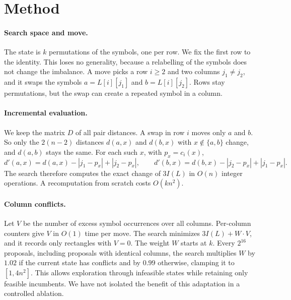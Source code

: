 \documentclass[11pt]{article}
\begin{document}
\section{Method}

\paragraph{Search space and move.} The state is $k$ permutations of the symbols, one per row. We
fix the first row to the identity. This loses no generality, because a relabelling of the
symbols does not change the imbalance. A move picks a row $i\ge 2$ and two columns
$j_1\ne j_2$, and it swaps the symbols $a=L[i][j_1]$ and $b=L[i][j_2]$. Rows stay permutations,
but the swap can create a repeated symbol in a column.

\paragraph{Incremental evaluation.} We keep the matrix $D$ of all pair distances. A swap in row
$i$ moves only $a$ and $b$. So only the $2(n-2)$ distances $d(a,x)$ and $d(b,x)$ with
$x\notin\{a,b\}$ change, and $d(a,b)$ stays the same. For each such $x$, with $p_x=c_i(x)$,
\[
  d'(a,x) = d(a,x) - |j_1-p_x| + |j_2-p_x|, \qquad d'(b,x) = d(b,x) - |j_2-p_x| + |j_1-p_x|.
\]
The search therefore computes the exact change of $3I(L)$ in $O(n)$ integer operations. A
recomputation from scratch costs $O(kn^2)$.

\paragraph{Column conflicts.} Let $V$ be the number of excess symbol occurrences over all
columns. Per-column counters give $V$ in $O(1)$ time per move. The search minimizes
$3I(L) + W\cdot V$, and it records only rectangles with $V=0$. The weight $W$ starts at $k$.
Every $2^{16}$ proposals, including proposals with identical columns, the search multiplies
$W$ by $1.02$ if the current state has conflicts and by $0.99$ otherwise, clamping it to
$[1,4n^2]$. This allows exploration through infeasible states while retaining only feasible
incumbents. We have not isolated the benefit of this adaptation in a controlled ablation.
\end{document}
